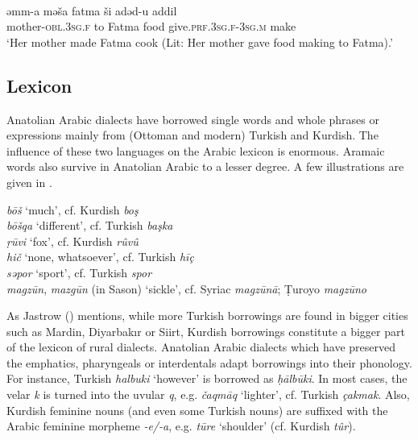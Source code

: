 \documentclass[output=paper]{langsci/langscibook}
\begin{document}
\begin{exe}
\ex \label{persa}
\\
\gll  	əmm-a mə\v{s}a fatma \v{s}i adəd-u    	addil	\\
  mother-\textsc{obl.3sg.f} to Fatma food      give.\textsc{prf.3sg.f-3sg.m}	make	 \\
        \glt `Her mother made Fatma cook (Lit: Her mother gave food making to Fatma).' 
\end{exe}



\subsection{Lexicon}
Anatolian Arabic dialects have borrowed single words and whole phrases or expressions mainly from (Ottoman and modern) Turkish and Kurdish. The influence of these two languages on the Arabic lexicon is enormous. Aramaic words also survive in Anatolian Arabic to a lesser degree. A few illustrations are given in . 

\ea \label{lex}
\noindent \textit{b\={o}\v{s}} `much', cf. Kurdish \textit{bo\c{s}}\\
\textit{b\={o}\v{s}qa} `different', cf. Turkish \textit{ba\c{s}ka}\\
\textit{\d{r}\={u}vi} `fox', cf. Kurdish \textit{r\^{u}v\^{u}}\\
\textit{hi\v{c}} `none, whatsoever', cf. Turkish \textit{hī\c{c}}\\
\textit{səpor} `sport', cf. Turkish \textit{spor}\\
\textit{magz\={u}n}, \textit{mazg\={u}n} (in Sason) `sickle', cf. Syriac \textit{magz\={u}n\={a}}; \d{T}uroyo \textit{magz\={u}no}\\
\z

\noindent As Jastrow (\citeyear[95]{Jastrow2011anatolian}) mentions, while more Turkish borrowings are found in bigger cities such as Mardin, Diyarbak{\i}r or Siirt, Kurdish borrowings constitute a bigger part of the lexicon of rural dialects. Anatolian Arabic dialects which have preserved the emphatics, pharyngeals or interdentals adapt borrowings into their phonology. For instance, Turkish \textit{halbuki} `however' is borrowed as \textit{\d{h}\={a}lb\={u}ki}. In most cases, the velar \textit{k} is turned into the uvular \textit{q}, e.g. \textit{\v{c}aqm\={a}q} `lighter', cf. Turkish \textit{\c{c}akmak}. Also, Kurdish feminine nouns (and even some Turkish nouns) are suffixed with the Arabic feminine morpheme \textit{-e/-a}, e.g. \textit{t\={u}re} `shoulder' (cf. Kurdish \textit{t\^{u}r}). 
\end{document}
